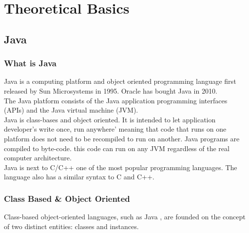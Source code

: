 \chapter{Theoretical Basics}
\section{Java}
\subsection{What is Java}
Java is a computing platform and object oriented programming language first released by Sun Microsystems in 1995. Oracle has bought Java in 2010.\cite{JavaWhat}
\\



The Java platform consists of the Java application programming interfaces (APIs) and the Java virtual machine (JVM).
\\



Java is class-bases and object oriented. It is intended to let application developer's write once, run anywhere' meaning that code that runs on one platform does not need to be recompiled to run on another. Java programs are compiled to byte-code. this code can run on any JVM regardless of the real computer architecture.\cite{javaWiki}
\\

Java is next to C/C++ one of the most popular programming languages.\cite{progLangPop} The language also has a similar syntax to C and C++.

\subsection{Class Based \& Object Oriented}
Class-based object-oriented languages, such as Java , are founded on the concept of two distinct entities: classes and instances.

